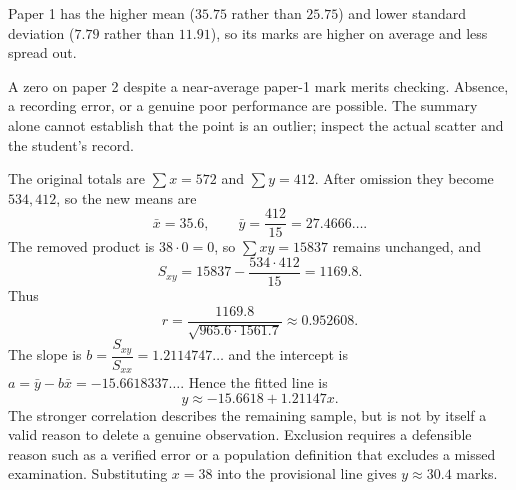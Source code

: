 Paper 1 has the higher mean ($35.75$ rather than $25.75$) and lower standard deviation ($7.79$ rather than $11.91$), so its marks are higher on average and less spread out.

A zero on paper 2 despite a near-average paper-1 mark merits checking. Absence, a recording error, or a genuine poor performance are possible. The summary alone cannot establish that the point is an outlier; inspect the actual scatter and the student's record.

The original totals are $\sum x=572$ and $\sum y=412$. After omission they become $534,412$, so the new means are
\[
\boxed{\bar x=35.6,\qquad\bar y=\dfrac{412}{15}=27.4666\ldots}.
\]
The removed product is $38\cdot0=0$, so $\sum xy=15837$ remains unchanged, and
\[
S_{xy}=15837-\dfrac{534\cdot412}{15}=1169.8.
\]
Thus
\[
\boxed{r=\dfrac{1169.8}{\sqrt{965.6\cdot1561.7}}\approx0.952608}.
\]
The slope is $b=\dfrac{S_{xy}}{S_{xx}}=1.2114747\ldots$ and the intercept is $a=\bar y-b\bar x=-15.6618337\ldots$. Hence the fitted line is
\[
\boxed{y\approx-15.6618+1.21147x}.
\]
The stronger correlation describes the remaining sample, but is not by itself a valid reason to delete a genuine observation. Exclusion requires a defensible reason such as a verified error or a population definition that excludes a missed examination. Substituting $x=38$ into the provisional line gives $\boxed{y\approx30.4}$ marks.
